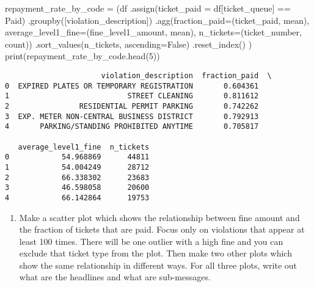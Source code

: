 \documentclass[
  letterpaper,
  DIV=11,
  numbers=noendperiod]{scrartcl}
\newenvironment{Shaded}{\begin{snugshade}}{\end{snugshade}}
\newcommand{\BuiltInTok}[1]{\textcolor[rgb]{0.00,0.23,0.31}{#1}}
\newcommand{\DecValTok}[1]{\textcolor[rgb]{0.68,0.00,0.00}{#1}}
\newcommand{\NormalTok}[1]{\textcolor[rgb]{0.00,0.23,0.31}{#1}}
\newcommand{\OperatorTok}[1]{\textcolor[rgb]{0.37,0.37,0.37}{#1}}
\newcommand{\StringTok}[1]{\textcolor[rgb]{0.13,0.47,0.30}{#1}}
\newcommand{\VariableTok}[1]{\textcolor[rgb]{0.07,0.07,0.07}{#1}}
\providecommand{\tightlist}{%
  \setlength{\itemsep}{0pt}\setlength{\parskip}{0pt}}\usepackage{longtable,booktabs,array}
\begin{document}
\begin{Shaded}
\begin{Highlighting}[]
\NormalTok{repayment\_rate\_by\_code }\OperatorTok{=}\NormalTok{ (df}
\NormalTok{    .assign(ticket\_paid }\OperatorTok{=}\NormalTok{ df[}\StringTok{\textquotesingle{}ticket\_queue\textquotesingle{}}\NormalTok{] }\OperatorTok{==} \StringTok{\textquotesingle{}Paid\textquotesingle{}}\NormalTok{)}
\NormalTok{    .groupby([}\StringTok{\textquotesingle{}violation\_description\textquotesingle{}}\NormalTok{])}
\NormalTok{    .agg(fraction\_paid}\OperatorTok{=}\NormalTok{(}\StringTok{\textquotesingle{}ticket\_paid\textquotesingle{}}\NormalTok{, }\StringTok{\textquotesingle{}mean\textquotesingle{}}\NormalTok{), }
\NormalTok{        average\_level1\_fine}\OperatorTok{=}\NormalTok{(}\StringTok{\textquotesingle{}fine\_level1\_amount\textquotesingle{}}\NormalTok{, }\StringTok{\textquotesingle{}mean\textquotesingle{}}\NormalTok{),}
\NormalTok{        n\_tickets}\OperatorTok{=}\NormalTok{(}\StringTok{\textquotesingle{}ticket\_number\textquotesingle{}}\NormalTok{, }\StringTok{\textquotesingle{}count\textquotesingle{}}\NormalTok{))}
\NormalTok{    .sort\_values(}\StringTok{\textquotesingle{}n\_tickets\textquotesingle{}}\NormalTok{, ascending}\OperatorTok{=}\VariableTok{False}\NormalTok{)}
\NormalTok{    .reset\_index()}
\NormalTok{)}
\BuiltInTok{print}\NormalTok{(repayment\_rate\_by\_code.head(}\DecValTok{5}\NormalTok{))}
\end{Highlighting}
\end{Shaded}

\begin{verbatim}
                      violation_description  fraction_paid  \
0  EXPIRED PLATES OR TEMPORARY REGISTRATION       0.604361   
1                           STREET CLEANING       0.811612   
2                RESIDENTIAL PERMIT PARKING       0.742262   
3  EXP. METER NON-CENTRAL BUSINESS DISTRICT       0.792913   
4       PARKING/STANDING PROHIBITED ANYTIME       0.705817   

   average_level1_fine  n_tickets  
0            54.968869      44811  
1            54.004249      28712  
2            66.338302      23683  
3            46.598058      20600  
4            66.142864      19753  
\end{verbatim}

\begin{enumerate}
\def\labelenumi{\arabic{enumi}.}
\setcounter{enumi}{1}
\tightlist
\item
  Make a scatter plot which shows the relationship between fine amount
  and the fraction of tickets that are paid. Focus only on violations
  that appear at least 100 times. There will be one outlier with a high
  fine and you can exclude that ticket type from the plot. Then make two
  other plots which show the same relationship in different ways. For
  all three plots, write out what are the headlines and what are
  sub-messages.
\end{enumerate}
\end{document}
